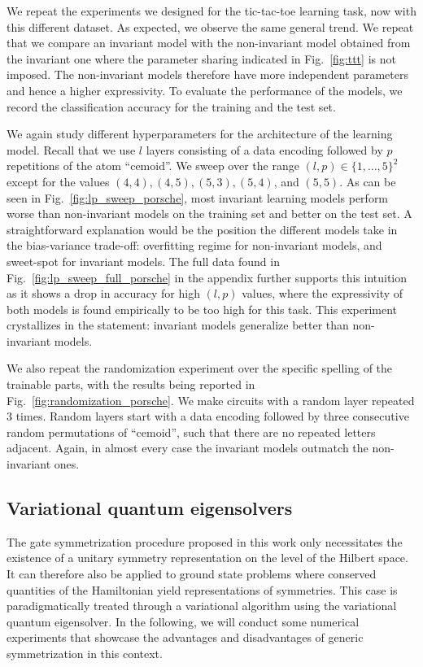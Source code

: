 \documentclass[a4paper,twocolumn,notitlepage,nofootinbib,superscriptaddress,floatfix]{revtex4-2}
\begin{document}
We repeat the experiments we designed for the tic-tac-toe learning task, now with this different dataset.
As expected, we observe the same general trend.
We repeat that we compare an invariant model with the non-invariant model obtained from the invariant one where the parameter sharing indicated in Fig.~\ref{fig:ttt} is not imposed. The non-invariant models therefore have more independent parameters and hence a higher expressivity.
To evaluate the performance of the models, we record the classification accuracy for the training and the test set.

We again study different hyperparameters for the architecture of the learning model. Recall that we use $l$ layers consisting of a data encoding followed by $p$ repetitions of the atom \enquote{cemoid}.
We sweep over the range $(l,p)\in\{1,\dots,5\}^2$ except for the values $(4,4), (4,5), (5,3), (5,4)$, and $(5,5)$.
As can be seen in Fig.~\ref{fig:lp_sweep_porsche}, most invariant learning models perform worse than non-invariant models on the training set and better on the test set.
A straightforward explanation would be the position the different models take in the bias-variance trade-off: overfitting regime for non-invariant models, and sweet-spot for invariant models.
The full data found in Fig.~\ref{fig:lp_sweep_full_porsche} in the appendix further supports this intuition as it shows a drop in accuracy for high $(l,p)$ values, where the expressivity of both models is found empirically to be too high for this task.
This experiment crystallizes in the statement: invariant models generalize better than non-invariant models.

We also repeat the randomization experiment over the specific spelling of the trainable parts, with the results being reported in Fig.~\ref{fig:randomization_porsche}.
We make circuits with a random layer repeated $3$ times.
Random layers start with a data encoding followed by three consecutive random permutations of \enquote{cemoid}, such that there are no repeated letters adjacent.
Again, in almost every case the invariant models outmatch the non-invariant ones.

\subsection*{Variational quantum eigensolvers}

The gate symmetrization procedure proposed in this work only necessitates the existence of a unitary symmetry representation on the level of the Hilbert space. It can therefore also be applied to ground state problems where conserved quantities of the Hamiltonian yield representations of symmetries. This case is paradigmatically treated through a variational algorithm using the variational quantum eigensolver. In the following, we will conduct some numerical experiments that showcase the advantages and disadvantages of generic symmetrization in this context.
\end{document}
